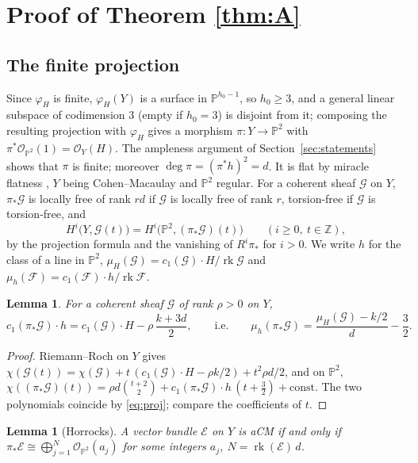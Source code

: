 \documentclass[11pt]{amsart}
\newtheorem{lemma}[theorem]{Lemma}
\theoremstyle{remark}
\theoremstyle{definition}
\newcommand{\PP}{\mathbb{P}}
\newcommand{\ZZ}{\mathbb{Z}}
\newcommand{\cO}{\mathcal{O}}
\newcommand{\cE}{\mathcal{E}}
\newcommand{\cF}{\mathcal{F}}
\newcommand{\cG}{\mathcal{G}}
\newcommand{\rk}{\operatorname{rk}}
\begin{document}
\section{Proof of Theorem \ref{thm:A}}\label{sec:proofA}

\subsection*{The finite projection}
Since $\varphi_H$ is finite, $\varphi_H(Y)$ is a surface in $\PP^{h_0-1}$, so $h_0\ge3$, and a general linear subspace of codimension $3$ (empty if $h_0=3$) is disjoint from it; composing the resulting projection with $\varphi_H$ gives a morphism $\pi\colon Y\to\PP^2$ with $\pi^*\cO_{\PP^2}(1)=\cO_Y(H)$. The ampleness argument of Section~\ref{sec:statements} shows that $\pi$ is finite; moreover $\deg\pi=(\pi^*h)^2=d$. It is flat by miracle flatness \cite[Thm.~23.1]{Mat}, $Y$ being Cohen--Macaulay and $\PP^2$ regular. For a coherent sheaf $\cG$ on $Y$, $\pi_*\cG$ is locally free of rank $rd$ if $\cG$ is locally free of rank $r$, torsion-free if $\cG$ is torsion-free, and
\begin{equation}\label{eq:proj}
H^i\bigl(Y,\cG(t)\bigr)=H^i\bigl(\PP^2,(\pi_*\cG)(t)\bigr)\qquad(i\ge0,\ t\in\ZZ),
\end{equation}
by the projection formula and the vanishing of $R^i\pi_*$ for $i>0$. We write $h$ for the class of a line in $\PP^2$, $\mu_H(\cG)=c_1(\cG)\cdot H/\rk\cG$ and $\mu_h(\cF)=c_1(\cF)\cdot h/\rk\cF$.

\begin{lemma}\label{lem:slope}
For a coherent sheaf $\cG$ of rank $\rho>0$ on $Y$,
\[
c_1(\pi_*\cG)\cdot h=c_1(\cG)\cdot H-\rho\,\frac{k+3d}{2},\qquad\text{i.e.}\qquad
\mu_h(\pi_*\cG)=\frac{\mu_H(\cG)-k/2}{d}-\frac32 .
\]
\end{lemma}

\begin{proof}
Riemann--Roch on $Y$ gives $\chi(\cG(t))=\chi(\cG)+t\,(c_1(\cG)\cdot H-\rho k/2)+t^2\rho d/2$, and on $\PP^2$, $\chi((\pi_*\cG)(t))=\rho d\binom{t+2}{2}+c_1(\pi_*\cG)\cdot h\,(t+\tfrac32)+\mathrm{const}$. The two polynomials coincide by \eqref{eq:proj}; compare the coefficients of $t$.
\end{proof}

\begin{lemma}[Horrocks]\label{lem:horrocks}
A vector bundle $\cE$ on $Y$ is aCM if and only if $\pi_*\cE\cong\bigoplus_{j=1}^{N}\cO_{\PP^2}(a_j)$ for some integers $a_j$, $N=\rk(\cE)\,d$.
\end{lemma}
\end{document}
